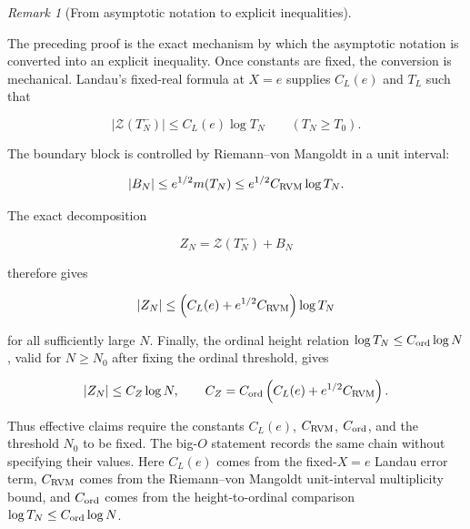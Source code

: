 \documentclass[11pt]{amsart}
\numberwithin{equation}{section}
\theoremstyle{plain}
\theoremstyle{definition}
\theoremstyle{remark}
\newtheorem{remark}[theorem]{Remark}
\begin{document}
\begin{remark}[From asymptotic notation to explicit inequalities]
\label{rem:explicit_constants_logarithmic_bound}

The preceding proof is the exact mechanism by which the asymptotic
notation is converted into an explicit inequality. Once constants are
fixed, the conversion is mechanical. Landau's fixed-real formula at
\(X=e\) supplies \(C_L(e)\) and \(T_L\) such that

\begin{equation}
|\mathcal Z(T_N^-)|\le C_L(e)\log T_N
\qquad (T_N\ge T_0).
\end{equation}

The boundary block is controlled by Riemann--von Mangoldt in a unit
interval:

\begin{equation}
|B_N|
\le e^{1/2}m(T_N)
\le e^{1/2}C_{\rm RVM}\log T_N.
\end{equation}

The exact decomposition

\begin{equation}
Z_N=\mathcal Z(T_N^-)+B_N
\end{equation}

therefore gives

\begin{equation}
|Z_N|
\le
\left(C_L(e)+e^{1/2}C_{\rm RVM}\right)\log T_N
\end{equation}

for all sufficiently large \(N\). Finally, the ordinal height relation
\(\log T_N\le C_{\rm ord}\log N\), valid for \(N\ge N_0\) after fixing
the ordinal threshold, gives

\begin{equation}
|Z_N|\le C_Z\log N,
\qquad
C_Z=C_{\rm ord}\left(C_L(e)+e^{1/2}C_{\rm RVM}\right).
\end{equation}

Thus effective claims require the constants \(C_L(e)\), \(C_{\rm RVM}\),
\(C_{\rm ord}\), and the threshold \(N_0\) to be fixed. The big-\(O\)
statement records the same chain without specifying their values. Here
\(C_L(e)\) comes from the fixed-\(X=e\) Landau error term,
\(C_{\rm RVM}\) comes from the Riemann--von Mangoldt unit-interval
multiplicity bound, and \(C_{\rm ord}\) comes from the height-to-ordinal
comparison \(\log T_N\le C_{\rm ord}\log N\).

\end{remark}
\end{document}

